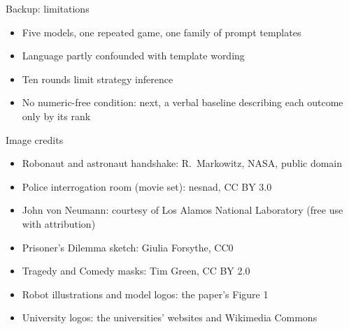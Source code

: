 \documentclass[11pt,aspectratio=43]{beamer}
\begin{document}
\begin{frame}{Backup: limitations}
  \begin{itemize}
    \item Five models, one repeated game, one family of prompt templates
    \medskip
    \item Language partly confounded with template wording
    \medskip
    \item Ten rounds limit strategy inference
    \medskip
    \item No numeric-free condition: next, a verbal baseline describing each
      outcome only by its rank
  \end{itemize}
\end{frame}

\begin{frame}{Image credits}
  \medskip
  \begin{itemize}\small\mdseries
    \item Robonaut and astronaut handshake: R.\ Markowitz, NASA, public domain
    \item Police interrogation room (movie set): nesnad, CC BY 3.0
    \item John von Neumann: courtesy of Los Alamos National Laboratory
      (free use with attribution)
    \item Prisoner's Dilemma sketch: Giulia Forsythe, CC0
    \item Tragedy and Comedy masks: Tim Green, CC BY 2.0
    \item Robot illustrations and model logos: the paper's Figure 1
    \item University logos: the universities' websites and Wikimedia Commons
  \end{itemize}
\end{frame}
\end{document}

